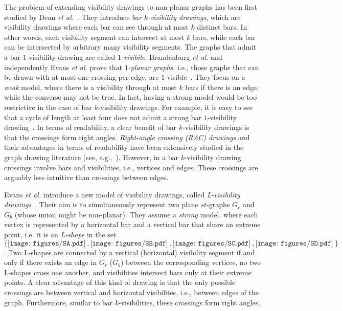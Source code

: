 \documentclass[a4paper]{article}
\newcommand{\SA}{\texttt{[image: figures/SA.pdf]}~}
\newcommand{\SB}{\texttt{[image: figures/SB.pdf]}~}
\newcommand{\SC}{\texttt{[image: figures/SC.pdf]}~}
\newcommand{\SD}{\texttt{[image: figures/SD.pdf]}~}
\newcommand{\shapes}{$\{\SA,\SB,\SC,\SD\}$\xspace}
\begin{document}
The problem of extending visibility drawings to non-planar graphs has been first studied by Dean {\em et al.}~\cite{DBLP:journals/jgaa/DeanEGLST07}. They introduce \emph{bar $k$-visibility drawings}, which are visibility drawings where each bar can see through at most $k$ distinct bars. In other words, each visibility segment can intersect at most $k$ bars, while each bar can be intersected by arbitrary many visibility segments. The graphs that admit a bar $1$-visibility drawing are called \emph{$1$-visibile}. Brandenburg {\em et al.} and independently Evans {\em et al.} prove that \emph{$1$-planar graphs}, i.e., those graphs that can be drawn with at most one crossing per edge, are $1$-visible~\cite{DBLP:journals/jgaa/Brandenburg14,DBLP:journals/jgaa/Evans0LMW14}. They focus on a \emph{weak} model, where there is a visibility through at most $k$ bars if there is an edge, while the converse may not be true. In fact, having a strong model would be too restrictive in the case of bar $k$-visibility drawings. For example, it is easy to see that a cycle of length at least four does not admit a strong bar $1$-visibility drawing~\cite{DBLP:journals/jgaa/Brandenburg14}. In terms of readability, a clear benefit of bar $k$-visibility drawings is that the crossings form right angles. \emph{Right-angle crossing (RAC) drawings} and their advantages in terms of readability have been extensively studied in the graph drawing literature (see, e.g.,~\cite{dl-cargd-12,DBLP:conf/apvis/HuangHE08}). However, in a bar $k$-visibility drawing crossings involve bars and visibilities, i.e., vertices and edges. These crossings are arguably less intuitive than crossings between edges.

Evans {\em et al.} introduce a new model of visibility drawings, called {\em L-visibility drawings}~\cite{elm-svrp+-15}. Their aim is to simultaneously represent two plane $st$-graphs $G_r$ and $G_b$ (whose union might be non-planar). They assume a {\em strong} model, where each vertex is represented by a horizontal bar and a vertical bar that share an extreme point, i.e. it is an {\em L-shape} in the set \shapes.  Two L-shapes are connected by a vertical (horizontal) visibility segment if and only if there exists an edge in $G_r$ ($G_b$) between the corresponding vertices,  no two L-shapes cross one another, and visibilities intersect bars only at their extreme points. A clear advantage of this kind of drawing is that the only possible crossings are between vertical and horizontal visibilites, i.e., between edges of the graph. Furthermore, similar to bar $k$-visibilities, these crossings form right angles. 
\end{document}
